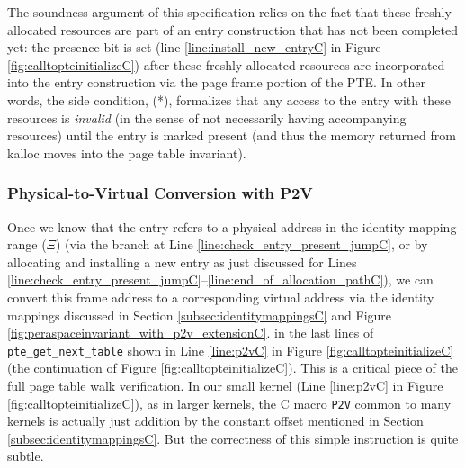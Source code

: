The soundness argument of this specification relies on the fact that these freshly allocated resources are part
of an entry construction that has not been completed yet: the presence bit is set (line \ref{line:install_new_entryC} in Figure \ref{fig:calltopteinitializeC}) after these freshly allocated resources are incorporated into the
entry construction via the page frame portion of the PTE. In other words, the side condition, (*),
 formalizes that any access to the entry with these resources is \textit{invalid} (in the sense of not necessarily
having accompanying resources) until the entry is marked present (and thus the memory returned from \textsf{kalloc}
moves into the page table invariant).

\subsubsection{Physical-to-Virtual Conversion with \textsf{P2V}}
\label{sec:p2vC}
Once we know that the entry refers to a physical address in the identity mapping range ($\Xi$)
(via the branch at Line \ref{line:check_entry_present_jumpC}, or by allocating and installing a new entry
as just discussed for Lines \ref{line:check_entry_present_jumpC}--\ref{line:end_of_allocation_pathC}), 
we can convert this frame address to a corresponding virtual address via the identity mappings
discussed in Section \ref{subsec:identitymappingsC} and Figure \ref{fig:peraspaceinvariant_with_p2v_extensionC}.
in the last lines of \lstinline|pte_get_next_table| shown in Line \ref{line:p2vC} in Figure \ref{fig:calltopteinitializeC} (the continuation of Figure \ref{fig:calltopteinitializeC}).
This is a critical piece of the full page table walk verification.
In our small kernel (Line \ref{line:p2vC} in Figure \ref{fig:calltopteinitializeC}), as in larger kernels, the C macro \texttt{P2V} common to many kernels
is actually just addition by the constant offset mentioned in Section \ref{subsec:identitymappingsC}.
But the correctness of this simple instruction is quite subtle.

